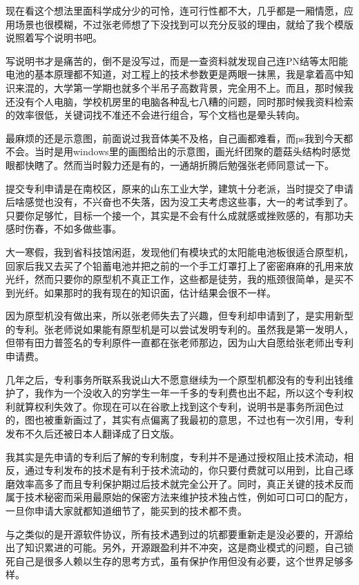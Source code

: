 \documentclass[
]{book}
\begin{document}
现在看这个想法里面科学成分少的可怜，连可行性都不大，几乎都是一厢情愿，应用场景也很模糊，不过张老师想了下没找到可以充分反驳的理由，就给了我个模版说照着写个说明书吧。

写说明书才是痛苦的，倒不是没写过，而是一查资料就发现自己连PN结等太阳能电池的基本原理都不知道，对工程上的技术参数更是两眼一抹黑，我是拿着高中知识来混的，大学第一学期也就多个半吊子高数背景，完全用不上。而且，那时候我还没有个人电脑，学校机房里的电脑各种乱七八糟的问题，同时那时候我资料检索的效率很低，关键词找不准还不会进行组合，写个文档也是晕头转向。

最麻烦的还是示意图，前面说过我音体美不及格，自己画都难看，而ps我到今天都不会。当时是用windows里的画图给出的示意图，画光纤团聚的蘑菇头结构时感觉眼都快瞎了。然而当时毅力还是有的，一通胡折腾后勉强张老师同意试一下。

提交专利申请是在南校区，原来的山东工业大学，建筑十分老派，当时提交了申请后啥感觉也没有，不兴奋也不失落，因为没工夫考虑这些事，大一的考试季到了。只要你足够忙，目标一个接一个，其实是不会有什么成就感或挫败感的，有那功夫感时伤春，不如多做些事。

大一寒假，我到省科技馆闲逛，发现他们有模块式的太阳能电池板很适合原型机，回家后我又去买了个铅蓄电池并把之前的一个手工灯罩打上了密密麻麻的孔用来放光纤，然而只要你的原型机不真正工作，这些都是徒劳，我的瓶颈很简单，是买不到光纤。如果那时的我有现在的知识面，估计结果会很不一样。

因为原型机没有做出来，所以张老师失去了兴趣，但专利却申请到了，是实用新型的专利。张老师说如果能有原型机是可以尝试发明专利的。虽然我是第一发明人，但带有田力普签名的专利原件一直都在张老师那边，因为山大自愿给张老师出专利申请费。

几年之后，专利事务所联系我说山大不愿意继续为一个原型机都没有的专利出钱维护了，我作为一个没收入的穷学生一年一千多的专利费也出不起，所以这个专利权利就算权利失效了。你现在可以在谷歌上找到这个专利，说明书是事务所润色过的，图也被重新画过了，其实有点偏离了我最初的意思，不过也有一次引用，专利发布不久后还被日本人翻译成了日文版。

我其实是先申请的专利后了解的专利制度，专利并不是通过授权阻止技术流动，相反，通过专利发布的技术是有利于技术流动的，你只要付费就可以用到，比自己琢磨效率高多了而且专利保护期过后技术就完全公开了。同时，真正关键的技术反而属于技术秘密而采用最原始的保密方法来维护技术独占性，例如可口可口的配方，一旦你申请大家就都知道细节了，能买到的技术都不贵。

与之类似的是开源软件协议，所有技术遇到过的坑都要重新走是没必要的，开源给出了知识累进的可能。另外，开源跟盈利并不冲突，这是商业模式的问题，自己锁死自己是很多人赖以生存的思考方式，虽有保护作用但没有必要，这个世界足够多样。
\end{document}
